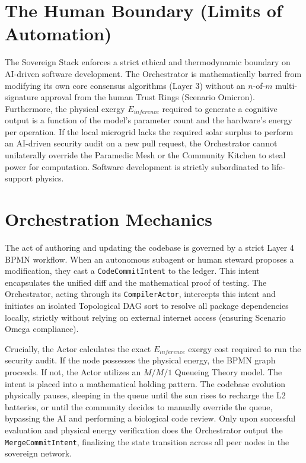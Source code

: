\section{The Human Boundary (Limits of Automation)}
The Sovereign Stack enforces a strict ethical and thermodynamic boundary on AI-driven software development. The Orchestrator is mathematically barred from modifying its own core consensus algorithms (Layer 3) without an $n$-of-$m$ multi-signature approval from the human Trust Rings (Scenario Omicron). Furthermore, the physical exergy $E_{inference}$ required to generate a cognitive output is a function of the model's parameter count and the hardware's energy per operation. If the local microgrid lacks the required solar surplus to perform an AI-driven security audit on a new pull request, the Orchestrator cannot unilaterally override the Paramedic Mesh or the Community Kitchen to steal power for computation. Software development is strictly subordinated to life-support physics.

\section{Orchestration Mechanics}
The act of authoring and updating the codebase is governed by a strict Layer 4 BPMN workflow.
When an autonomous subagent or human steward proposes a modification, they cast a \texttt{CodeCommitIntent} to the ledger. This intent encapsulates the unified diff and the mathematical proof of testing. The Orchestrator, acting through its \texttt{CompilerActor}, intercepts this intent and initiates an isolated Topological DAG sort to resolve all package dependencies locally, strictly without relying on external internet access (ensuring Scenario Omega compliance).

Crucially, the Actor calculates the exact $E_{inference}$ exergy cost required to run the security audit. If the node possesses the physical energy, the BPMN graph proceeds. If not, the Actor utilizes an $M/M/1$ Queueing Theory model. The intent is placed into a mathematical holding pattern. The codebase evolution physically pauses, sleeping in the queue until the sun rises to recharge the L2 batteries, or until the community decides to manually override the queue, bypassing the AI and performing a biological code review. Only upon successful evaluation and physical energy verification does the Orchestrator output the \texttt{MergeCommitIntent}, finalizing the state transition across all peer nodes in the sovereign network.
